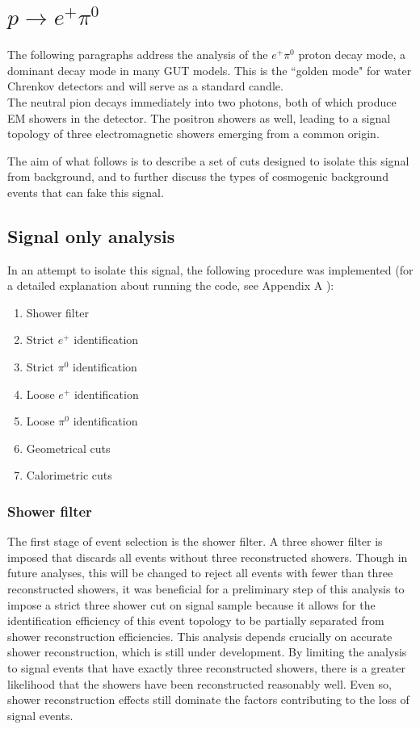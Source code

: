 \documentclass[a4paper, 10pt]{article}
\begin{document}
\clearpage
\section{$p \rightarrow e^{+} \pi^{0}$}
The following paragraphs address the analysis of the  $e^{+} \pi^{0}$ proton decay mode, a dominant decay mode in many GUT models. This is the ``golden mode" for water Chrenkov detectors and will serve as a standard candle.\\
The neutral pion decays immediately into two photons, both of which produce EM showers in the detector. The positron showers as well, leading to a signal topology of three electromagnetic showers emerging from a common origin.

The aim of what follows is to describe a set of cuts designed to isolate this signal from background, and to further discuss the types of cosmogenic background events that can fake this signal.

\subsection{Signal only analysis}

In an attempt to isolate this signal, the following procedure was implemented (for a detailed explanation about running the code, see Appendix A ):
\begin{enumerate}[topsep=10pt,itemsep=-1ex,partopsep=10pt,parsep=1ex]
\item Shower filter
\item Strict $e^{+}$ identification
\item Strict $\pi^{0}$ identification
\item Loose $e^{+}$ identification
\item Loose $\pi^{0}$ identification
\item Geometrical cuts
\item Calorimetric cuts
\end{enumerate}


\subsubsection{Shower filter}

The first stage of event selection is the shower filter. A three shower filter is imposed that discards all events without three reconstructed showers. Though in future analyses, this will be changed to reject all events with fewer than three reconstructed showers, it was beneficial for a preliminary step of this analysis to impose a strict three shower cut on signal sample because it allows for the identification efficiency of this event topology to be partially separated from shower reconstruction efficiencies. This analysis depends crucially on accurate shower reconstruction, which is still under development. By limiting the analysis to signal events that have exactly three reconstructed showers, there is a greater likelihood that the showers have been reconstructed reasonably well. Even so, shower reconstruction effects still dominate the factors contributing to the loss of signal events.
\end{document}
